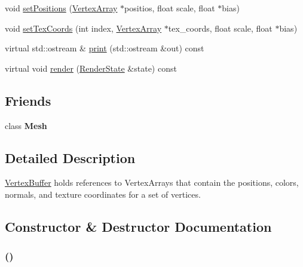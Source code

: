 \begin{CompactItemize}
\item 
void \hyperlink{classm3g_1_1VertexBuffer_527460407f488d5128bae7d0adb6da43}{setPositions} (\hyperlink{classm3g_1_1VertexArray}{VertexArray} $\ast$positios, float scale, float $\ast$bias)
\item 
void \hyperlink{classm3g_1_1VertexBuffer_9fd3dd3f78138d654d18863e4f1329f4}{setTexCoords} (int index, \hyperlink{classm3g_1_1VertexArray}{VertexArray} $\ast$tex\_\-coords, float scale, float $\ast$bias)
\item 
virtual std::ostream \& \hyperlink{classm3g_1_1VertexBuffer_6fea17fa1532df3794f8cb39cb4f911f}{print} (std::ostream \&out) const 
\item 
virtual void \hyperlink{classm3g_1_1VertexBuffer_8babc8a79b78615da51161e94029eea9}{render} (\hyperlink{structm3g_1_1RenderState}{RenderState} \&state) const 
\end{CompactItemize}
\subsection*{Friends}
\begin{CompactItemize}
\item 
\hypertarget{classm3g_1_1VertexBuffer_a41a130f156b145bffb3f4b5172c4c93}{
class \textbf{Mesh}}
\label{classm3g_1_1VertexBuffer_a41a130f156b145bffb3f4b5172c4c93}

\end{CompactItemize}


\subsection{Detailed Description}
\hyperlink{classm3g_1_1VertexBuffer}{VertexBuffer} holds references to VertexArrays that contain the positions, colors, normals, and texture coordinates for a set of vertices. 

\subsection{Constructor \& Destructor Documentation}
\hypertarget{classm3g_1_1VertexBuffer_fd7b13840c99c57d27316c8f8434dc49}{
\subsubsection[{VertexBuffer}]{ ()}}
\label{classm3g_1_1VertexBuffer_fd7b13840c99c57d27316c8f8434dc49}



